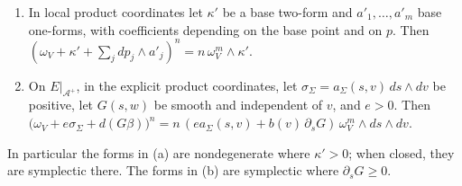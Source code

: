 \begin{lemma}\label{I:lem:hdl-top-power}
\begin{enumerate}[label=(\alph*)]
\item In local product coordinates let $\kappa'$ be a base two-form and $a'_1,\dots,a'_m$ base one-forms, with
coefficients depending on the base point and on $p$. Then
$(\omega_V+\kappa'+\sum_jdp_j\wedge a'_j)^n=n\,\omega_V^m\wedge\kappa'$.
\item On $E|_{\mathcal A^+}$, in the explicit product coordinates, let $\sigma_\Sigma=a_\Sigma(s,v)\,ds\wedge dv$ be positive, let $G(s,w)$ be smooth and
independent of $v$, and $e>0$. Then
$\big(\omega_V+e\sigma_\Sigma+d(G\beta)\big)^n=n\,(e a_\Sigma(s,v)+b(v)\,\partial_sG)\,\omega_V^m\wedge ds\wedge dv$.
\end{enumerate}
In particular the forms in (a) are nondegenerate where $\kappa'>0$; when closed, they are
symplectic there. The forms in (b) are symplectic where $\partial_sG\ge0$.
\end{lemma}


